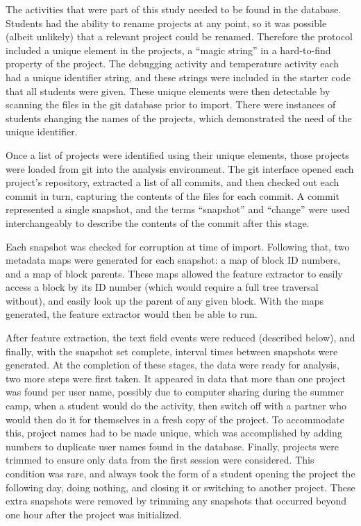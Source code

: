 The activities that were part of this study needed to be found in the database. Students had the ability to rename projects at any point, so it was possible (albeit unlikely) that a relevant project could be renamed. Therefore the protocol included a unique element in the projects, a ``magic string'' in a hard-to-find property of the project. The debugging activity and temperature activity each had a unique identifier string, and these strings were included in the starter code that all students were given. These unique elements were then detectable by scanning the files in the git database prior to import. There were instances of students changing the names of the projects, which demonstrated the need of the unique identifier. 

Once a list of projects were identified using their unique elements, those projects were loaded from git into the analysis environment. The git interface opened each project's repository, extracted a list of all commits, and then checked out each commit in turn, capturing the contents of the files for each commit. A commit represented a single snapshot, and the terms ``snapshot'' and ``change'' were used interchangeably to describe the contents of the commit after this stage. 

Each snapshot was checked for corruption at time of import. Following that, two metadata maps were generated for each snapshot: a map of block ID numbers, and a map of block parents. These maps allowed the feature extractor to easily access a block by its ID number (which would require a full tree traversal without), and easily look up the parent of any given block. With the maps generated, the feature extractor would then be able to run. 

After feature extraction, the text field events were reduced (described below), and finally, with the snapshot set complete, interval times between snapshots were generated. At the completion of these stages, the data were ready for analysis, two more steps were first taken. It appeared in data that more than one project was found per user name, possibly due to computer sharing during the summer camp, when a student would do the activity, then switch off with a partner who would then do it for themselves in a fresh copy of the project. To accommodate this, project names had to be made unique, which was accomplished by adding numbers to duplicate user names found in the database. Finally, projects were trimmed to ensure only data from the first session were considered. This condition was rare, and always took the form of a student opening the project the following day, doing nothing, and closing it or switching to another project. These extra snapshots were removed by trimming any snapshots that occurred beyond one hour after the project was initialized. 

